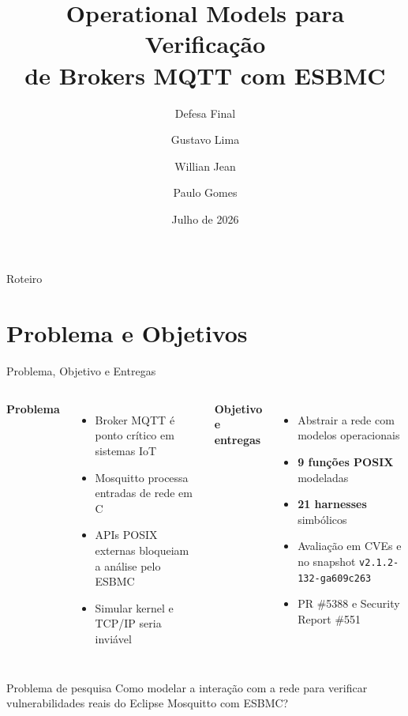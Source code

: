 \documentclass[10pt,aspectratio=169]{beamer}
\title{Operational Models para Verifica\c{c}\~ao\\de Brokers MQTT com ESBMC}
\subtitle{Defesa Final}
\author{Gustavo Lima \and Willian Jean \and Paulo Gomes}
\institute{Universidade Federal do Amazonas (UFAM)\\Orientador: Prof. Lucas Cordeiro}
\date{Julho de 2026}
\newcommand{\mosqversion}{\texttt{v2.1.2-132-ga609c263}}
\begin{document}
\maketitle

\begin{frame}{Roteiro}
    \tableofcontents[hideallsubsections]
\end{frame}

\section{Problema e Objetivos}

\begin{frame}{Problema, Objetivo e Entregas}
    \begin{columns}[T]
        \textbf{Problema}
        \begin{itemize}
            \item Broker MQTT \'e ponto cr\'itico em sistemas IoT
            \item Mosquitto processa entradas de rede em C
            \item APIs POSIX externas bloqueiam a an\'alise pelo ESBMC
            \item Simular kernel e TCP/IP seria invi\'avel
        \end{itemize}
        \textbf{Objetivo e entregas}
        \begin{itemize}
            \item Abstrair a rede com modelos operacionais
            \item \textbf{9 fun\c{c}\~oes POSIX} modeladas
            \item \textbf{21 harnesses} simb\'olicos
            \item Avalia\c{c}\~ao em CVEs e no snapshot \mosqversion
            \item PR \#5388 e Security Report \#551
        \end{itemize}
    \end{columns}
    \vspace{0.6em}
    \begin{alertblock}{Problema de pesquisa}
        Como modelar a intera\c{c}\~ao com a rede para verificar vulnerabilidades
        reais do Eclipse Mosquitto com ESBMC?
    \end{alertblock}
\end{frame}
\end{document}
